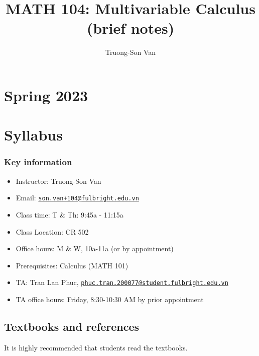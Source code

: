 \documentclass[
]{article}
\title{MATH 104: Multivariable Calculus (brief notes)}
\author{Truong-Son Van}
\date{}
\providecommand{\tightlist}{%
  \setlength{\itemsep}{0pt}\setlength{\parskip}{0pt}}
\begin{document}
\maketitle

{
\setcounter{tocdepth}{2}
\tableofcontents
}
\hypertarget{spring-2023}{%
\section*{Spring 2023}\label{spring-2023}}

\hypertarget{syllabus}{%
\section*{Syllabus}\label{syllabus}}

\hypertarget{key-information}{%
\subsubsection*{Key information}\label{key-information}}

\begin{itemize}
\tightlist
\item
  Instructor: Truong-Son Van
\item
  Email: \href{mailto:son.van+104@fulbright.edu.vn}{\nolinkurl{son.van+104@fulbright.edu.vn}}
\item
  Class time: T \& Th: 9:45a - 11:15a
\item
  Class Location: CR 502
\item
  Office hours: M \& W, 10a-11a (or by appointment)
\item
  Prerequisites: Calculus (MATH 101)
\item
  TA: Tran Lan Phuc, \href{mailto:phuc.tran.200077@student.fulbright.edu.vn}{\nolinkurl{phuc.tran.200077@student.fulbright.edu.vn}}
\item
  TA office hours: Friday, 8:30-10:30 AM by prior appointment
\end{itemize}

\hypertarget{textbooks-and-references}{%
\subsection*{Textbooks and references}\label{textbooks-and-references}}

It is highly recommended that students read the textbooks.
\end{document}
